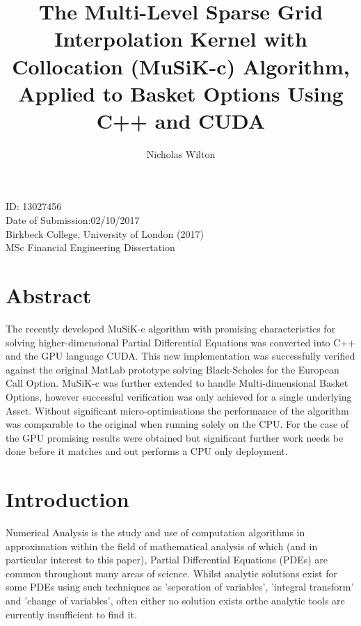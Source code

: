 \documentclass[a4paper]{amsart}
\begin{document}
\title[Multi-Level Sparse Grid Interpolation Kernel with Collocation (MuSiK-c) Algorithm]
{The Multi-Level Sparse Grid Interpolation Kernel with Collocation (MuSiK-c) Algorithm, Applied to Basket Options Using C++ and CUDA}
\author[Nicholas Wilton]{Nicholas Wilton}

\maketitle

\vspace*{\fill}

\noindent 
ID: 13027456\\
Date of Submission:02/10/2017\\
Birkbeck College, University of London (2017)\\
MSc Financial Engineering Dissertation
\newpage
\tableofcontents
\newpage

\section {Abstract}
The recently developed MuSiK-c algorithm with promising characteristics for solving higher-dimensional Partial Differential Equations was converted into C++ and the GPU language CUDA. This new implementation was successfully verified against the original MatLab prototype solving Black-Scholes for the European Call Option. MuSiK-c was further extended to handle Multi-dimensional Basket Options, however successful verification was only achieved for a single underlying Asset. Without significant micro-optimisations the performance of the algorithm was comparable to the original when running solely on the CPU. For the case of the GPU promising results were obtained but significant further work needs be done before it matches and out performs a CPU only deployment.
\newpage

\section{Introduction}

Numerical Analysis is the study and use of computation algorithms in approximation within the field of mathematical analysis of which (and in particular interest to this paper), Partial Differential Equations (PDEs) are common throughout many areas of science. Whilst analytic solutions exist for some PDEs using such techniques as 'seperation of variables', 'integral transform' and 'change of variables', often either no solution exists orthe analytic tools are currently insufficient to find it.   
\end{document}
